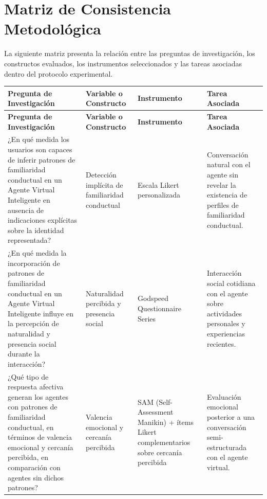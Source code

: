 \documentclass[12pt]{article}
\begin{document}
\section{Matriz de Consistencia Metodológica}

La siguiente matriz presenta la relación entre las preguntas de investigación, los constructos evaluados, los instrumentos seleccionados y las tareas asociadas dentro del protocolo experimental.

{
\small
\renewcommand{\arraystretch}{1.3}
\setlength{\emergencystretch}{3em}

\begin{longtable}{|
>{\raggedright\arraybackslash}p{4.5cm}|
>{\raggedright\arraybackslash}p{3cm}|
>{\raggedright\arraybackslash}p{3cm}|
>{\raggedright\arraybackslash}p{4cm}|}

\hline
\textbf{Pregunta de Investigación} &
\textbf{Variable o Constructo} &
\textbf{Instrumento} &
\textbf{Tarea Asociada} \\
\hline
\endfirsthead

\hline
\textbf{Pregunta de Investigación} &
\textbf{Variable o Constructo} &
\textbf{Instrumento} &
\textbf{Tarea Asociada} \\
\hline
\endhead

¿En qué medida los usuarios son capaces de inferir patrones de familiaridad conductual en un Agente Virtual Inteligente en ausencia de indicaciones explícitas sobre la identidad representada? &
Detección implícita de familiaridad conductual &
Escala Likert personalizada &
Conversación natural con el agente sin revelar la existencia de perfiles de familiaridad conductual. \\
\hline

¿En qué medida la incorporación de patrones de familiaridad conductual en un Agente Virtual Inteligente influye en la percepción de naturalidad y presencia social durante la interacción? &
Naturalidad percibida y presencia social &
Godspeed Questionnaire Series &
Interacción social cotidiana con el agente sobre actividades personales y experiencias recientes. \\
\hline

¿Qué tipo de respuesta afectiva generan los agentes con patrones de familiaridad conductual, en términos de valencia emocional y cercanía percibida, en comparación con agentes sin dichos patrones? &
Valencia emocional y cercanía percibida &
SAM (Self-Assessment Manikin) + ítems Likert complementarios sobre cercanía percibida &
Evaluación emocional posterior a una conversación semi-estructurada con el agente virtual. \\
\hline


\end{longtable}}
\end{document}
